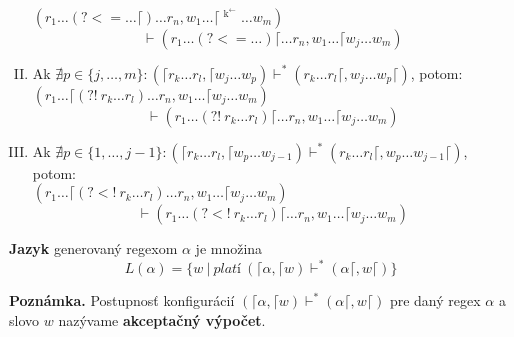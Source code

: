 \begin{df}
\begin{enumerate}[I.]
\\ $\displaystyle{(r_1\dots (?<=\dots\lceil) \dots r_n, w_1\dots \lceil \mathop{w_j}^{\mathop{k}^\leftarrow} \dots w_m )}$
$$ \vdash(r_1\dots (?<=\dots)\lceil \dots r_n, w_1 \dots \lceil w_j \dots w_m ) $$
\item Ak $\nexists p \in \lbrace j,\dots,m\rbrace: (\lceil r_k\dots r_l,\lceil w_j\dots w_p) \vdash^* (r_k\dots r_l\lceil, w_j\dots w_p \lceil)$, potom:
\\$\displaystyle{(r_1\dots\lceil (?!~r_{k}\dots r_{l} ) \dots r_n, w_1\dots \lceil w_j \dots w_m)}$
$$\vdash (r_1\dots (?!~r_{k}\dots r_{l} ) \lceil\dots r_n, w_1\dots \lceil w_j \dots w_m)$$
\item Ak $\nexists p \in \lbrace 1,\dots,j-1\rbrace: (\lceil r_k\dots r_l,\lceil w_p\dots w_{j-1}) \vdash^* (r_k\dots r_l\lceil, w_p \dots w_{j-1} \lceil)$, potom:
\\$\displaystyle{(r_1\dots\lceil (?<!~r_{k}\dots r_{l} ) \dots r_n, w_1\dots \lceil w_j \dots w_m)}$
$$\vdash (r_1\dots (?<!~r_{k}\dots r_{l} ) \lceil\dots r_n, w_1\dots \lceil w_j \dots w_m)$$
\end{enumerate}

\end{df}

\begin{df}
\textbf{Jazyk} generovaný regexom $\alpha$ je množina $$L(\alpha) = \lbrace w~|~platí ~ (\lceil \alpha, \lceil w)\vdash^* (\alpha\lceil, w\lceil) \rbrace$$
\end{df}

\textbf{Poznámka.}
Postupnosť konfigurácií $(\lceil \alpha, \lceil w)\vdash^* (\alpha\lceil, w\lceil)$ pre daný regex $\alpha$ a slovo $w$ nazývame \textbf{akceptačný výpočet}.

